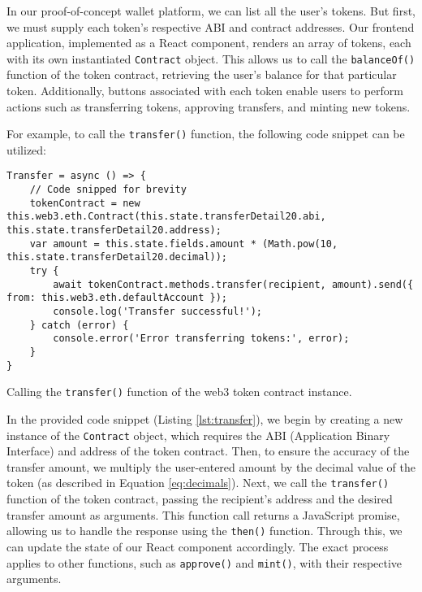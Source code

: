In our proof-of-concept wallet platform, we can list all the user's tokens. But first, we must supply each token's respective ABI and
contract addresses. Our frontend application, implemented as a React component, renders an array of tokens, each with its own
instantiated \texttt{Contract} object. This allows us to call the \texttt{balanceOf()} function of the token contract, retrieving the user's
balance for that particular token. Additionally, buttons associated with each token enable users to perform actions such as transferring tokens,
approving transfers, and minting new tokens.


For example, to call the \texttt{transfer()} function, the following code snippet can be utilized:


\begin{listing}[H]
    \begin{verbatim}
Transfer = async () => {
    // Code snipped for brevity
    tokenContract = new this.web3.eth.Contract(this.state.transferDetail20.abi, this.state.transferDetail20.address);
    var amount = this.state.fields.amount * (Math.pow(10, this.state.transferDetail20.decimal));
    try {
        await tokenContract.methods.transfer(recipient, amount).send({ from: this.web3.eth.defaultAccount });
        console.log('Transfer successful!');
    } catch (error) {
        console.error('Error transferring tokens:', error);
    }
}
    \end{verbatim}
    \caption{Calling the \texttt{transfer()} function of the web3 token contract instance.}
    \label{lst:transfer}
\end{listing}


In the provided code snippet (Listing \ref{lst:transfer}), we begin by creating a new instance of the \texttt{Contract} object, which requires the ABI (Application Binary Interface) and address of the token contract. Then, to ensure the accuracy of the transfer amount, we multiply the user-entered amount by the decimal value of the token (as described in Equation \ref{eq:decimals}).
Next, we call the \texttt{transfer()} function of the token contract, passing the recipient's address and the desired transfer amount as arguments. This function call returns a JavaScript promise, allowing us to handle the response using the \texttt{then()} function. Through this, we can update the state of our React component accordingly. The exact process applies to other functions, such as \texttt{approve()} and \texttt{mint()}, with their respective arguments.


